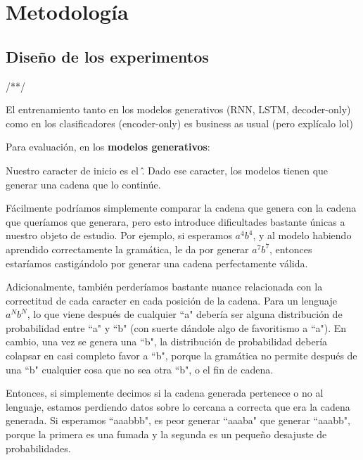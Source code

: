 
\chapter{Metodología}
\label{metodologia}

\section{Diseño de los experimentos}

/**/

El entrenamiento tanto en los modelos generativos (RNN, LSTM, decoder-only) como en los clasificadores (encoder-only) es business as usual 
(pero explícalo lol)

Para evaluación, en los \textbf{modelos generativos}:

Nuestro caracter de inicio es el \^. Dado ese caracter, los modelos tienen que generar una cadena que lo continúe.

Fácilmente podríamos simplemente comparar la cadena que genera con la cadena que queríamos que generara, pero esto introduce dificultades
bastante únicas a nuestro objeto de estudio.
Por ejemplo, si esperamos $a^4b^4$, y al modelo habiendo aprendido correctamente la gramática, le da por generar $a^7b^7$, 
entonces estaríamos castigándolo por generar una cadena perfectamente válida.

Adicionalmente, también perderíamos bastante nuance relacionada con la correctitud de cada caracter en cada posición de la cadena.
Para un lenguaje $a^Nb^N$, lo que viene después de cualquier ``a" debería ser alguna distribución de probabilidad entre ``a" y ``b" (con suerte
dándole algo de favoritismo a ``a"). En cambio, una vez se genera una ``b", la distribución de probabilidad debería colapsar en casi completo 
favor a ``b", porque la gramática no permite después de una ``b" cualquier cosa que no sea otra ``b", o el fin de cadena.

Entonces, si simplemente decimos si la cadena generada pertenece o no al lenguaje, estamos perdiendo datos sobre lo cercana a correcta que 
era la cadena generada. Si esperamos ``aaabbb", es peor generar ``aaaba" que generar ``aaabb", porque la primera es una fumada y la segunda es
un pequeño desajuste de probabilidades.

